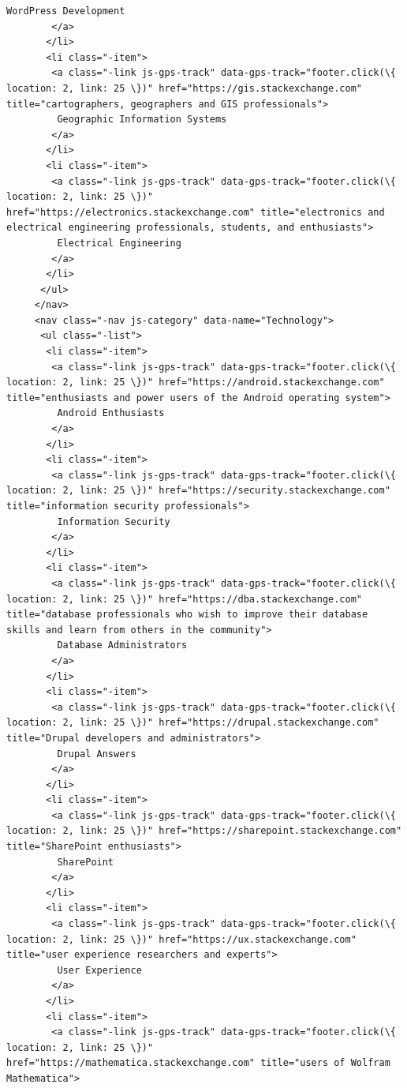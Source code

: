 \documentclass[11pt]{article}
\begin{document}
\begin{Verbatim}[commandchars=\\\{\}]
         WordPress Development
        </a>
       </li>
       <li class="-item">
        <a class="-link js-gps-track" data-gps-track="footer.click(\{ location: 2, link: 25 \})" href="https://gis.stackexchange.com" title="cartographers, geographers and GIS professionals">
         Geographic Information Systems
        </a>
       </li>
       <li class="-item">
        <a class="-link js-gps-track" data-gps-track="footer.click(\{ location: 2, link: 25 \})" href="https://electronics.stackexchange.com" title="electronics and electrical engineering professionals, students, and enthusiasts">
         Electrical Engineering
        </a>
       </li>
      </ul>
     </nav>
     <nav class="-nav js-category" data-name="Technology">
      <ul class="-list">
       <li class="-item">
        <a class="-link js-gps-track" data-gps-track="footer.click(\{ location: 2, link: 25 \})" href="https://android.stackexchange.com" title="enthusiasts and power users of the Android operating system">
         Android Enthusiasts
        </a>
       </li>
       <li class="-item">
        <a class="-link js-gps-track" data-gps-track="footer.click(\{ location: 2, link: 25 \})" href="https://security.stackexchange.com" title="information security professionals">
         Information Security
        </a>
       </li>
       <li class="-item">
        <a class="-link js-gps-track" data-gps-track="footer.click(\{ location: 2, link: 25 \})" href="https://dba.stackexchange.com" title="database professionals who wish to improve their database skills and learn from others in the community">
         Database Administrators
        </a>
       </li>
       <li class="-item">
        <a class="-link js-gps-track" data-gps-track="footer.click(\{ location: 2, link: 25 \})" href="https://drupal.stackexchange.com" title="Drupal developers and administrators">
         Drupal Answers
        </a>
       </li>
       <li class="-item">
        <a class="-link js-gps-track" data-gps-track="footer.click(\{ location: 2, link: 25 \})" href="https://sharepoint.stackexchange.com" title="SharePoint enthusiasts">
         SharePoint
        </a>
       </li>
       <li class="-item">
        <a class="-link js-gps-track" data-gps-track="footer.click(\{ location: 2, link: 25 \})" href="https://ux.stackexchange.com" title="user experience researchers and experts">
         User Experience
        </a>
       </li>
       <li class="-item">
        <a class="-link js-gps-track" data-gps-track="footer.click(\{ location: 2, link: 25 \})" href="https://mathematica.stackexchange.com" title="users of Wolfram Mathematica">

\end{Verbatim}
\end{document}
